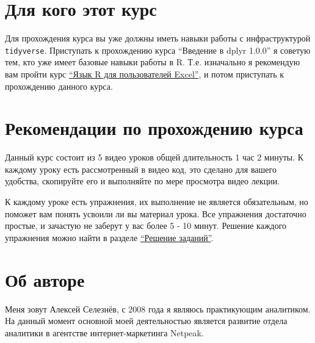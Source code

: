 \documentclass[
]{book}
\begin{document}
\hypertarget{ux434ux43bux44f-ux43aux43eux433ux43e-ux44dux442ux43eux442-ux43aux443ux440ux441}{%
\section*{Для кого этот курс}\label{ux434ux43bux44f-ux43aux43eux433ux43e-ux44dux442ux43eux442-ux43aux443ux440ux441}}

Для прохождения курса вы уже должны иметь навыки работы с инфраструктурой \texttt{tidyverse}. Приступать к прохождению курса ``Введение в dplyr 1.0.0'' я советую тем, кто уже имеет базовые навыки работы в R. Т.е. изначально я рекомендую вам пройти курс \href{https://alexey-seleznev.pro/r4excel_users/}{``Язык R для пользователей Excel''}, и потом приступать к прохождению данного курса.

\hypertarget{ux440ux435ux43aux43eux43cux435ux43dux434ux430ux446ux438ux438-ux43fux43e-ux43fux440ux43eux445ux43eux436ux434ux435ux43dux438ux44e-ux43aux443ux440ux441ux430}{%
\section*{Рекомендации по прохождению курса}\label{ux440ux435ux43aux43eux43cux435ux43dux434ux430ux446ux438ux438-ux43fux43e-ux43fux440ux43eux445ux43eux436ux434ux435ux43dux438ux44e-ux43aux443ux440ux441ux430}}

Данный курс состоит из 5 видео уроков общей длительность 1 час 2 минуты. К каждому уроку есть рассмотренный в видео код, это сделано для вашего удобства, скопируйте его и выполняйте по мере просмотра видео лекции.

К каждому уроке есть упражнения, их выполнение не является обязательным, но поможет вам понять усвоили ли вы материал урока. Все упражнения достаточно простые, и зачастую не заберут у вас более 5 - 10 минут. Решение каждого упражнения можно найти в разделе \href{решения-заданий.html}{``Решение заданий''}.

\hypertarget{ux43eux431-ux430ux432ux442ux43eux440ux435}{%
\section*{Об авторе}\label{ux43eux431-ux430ux432ux442ux43eux440ux435}}

Меня зовут Алексей Селезнёв, с 2008 года я являюсь практикующим аналитиком. На данный момент основной моей деятельностью является развитие отдела аналитики в агентстве интернет-маркетинга Netpeak.
\end{document}
